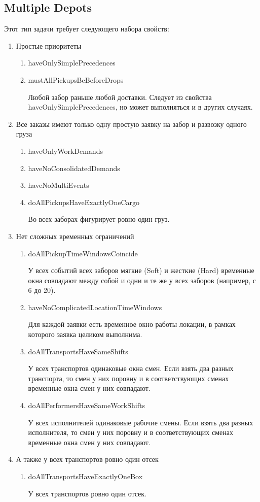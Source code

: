 \subsection{Multiple Depots}

Этот тип задачи требует следующего набора свойств:

\begin{enumerate}
	\item Простые приоритеты
	\begin{enumerate}
		\item haveOnlySimplePrecedences	
		\item mustAllPickupsBeBeforeDrops
		
		Любой забор раньше любой доставки. Следует из свойства haveOnlySimplePrecedences, но может выполняться и в других случаях.
	\end{enumerate}
	\item Все заказы имеют только одну простую заявку на забор и развозку одного груза
	\begin{enumerate}
		\item haveOnlyWorkDemands
		\item haveNoConsolidatedDemands
		\item haveNoMultiEvents	
		\item doAllPickupsHaveExactlyOneCargo
		
		Во всех заборах фигурирует ровно один груз.
	\end{enumerate}
	\item Нет сложных временных ограничений
	\begin{enumerate}
		\item doAllPickupTimeWindowsCoincide
		
		У всех событий всех заборов мягкие (Soft) и жесткие (Hard) временные окна совпадают между собой и одни и те же у всех заборов (например, с 6 до 20).
		\item haveNoComplicatedLocationTimeWindows
		
		Для каждой заявки есть временное окно работы локации, в рамках которого заявка целиком выполнима.
		\item doAllTransportsHaveSameShifts
		
        У всех транспортов одинаковые окна смен. Если взять два разных транспорта, то смен у них поровну и в соответствующих сменах временные окна смен у них совпадают.
		\item doAllPerformersHaveSameWorkShifts
		
		У всех исполнителей одинаковые рабочие смены. Если взять два разных исполнителя, то смен у них поровну и в соответствующих сменах временные окна смен у них совпадают.	
	\end{enumerate}
	\item А также у всех транспортов ровно один отсек
	\begin{enumerate}
		\item doAllTransportsHaveExactlyOneBox
		
		У всех транспортов ровно один отсек.
	\end{enumerate}
\end{enumerate}

